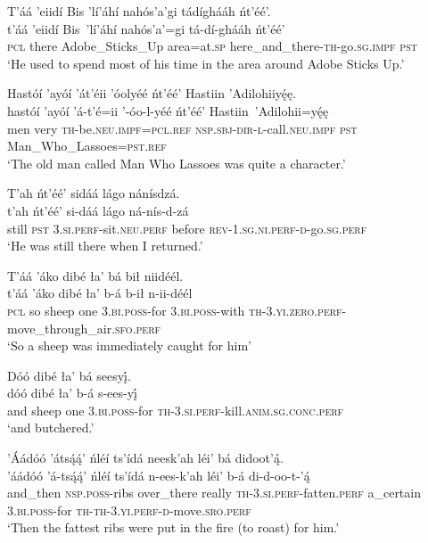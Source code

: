 \ea\label{ex:text2-3-2}
T’áá ’eiidí Bis ’lí’áhí nahós’a’gi tádíghááh ńt’éé’.\\
\gll t’áá	’eiidí	Bis~{’lí’áhí}	nahós’a’=gi	tá-dí-ghááh	ńt’éé’\\
     \textsc{pcl}	there	Adobe\_Sticks\_Up	area=at.\textsc{sp}	here\_and\_there-\textsc{th}-go.\textsc{sg}.\textsc{impf}	\textsc{pst}\\
\glt `He used to spend most of his time in the area around Adobe Sticks Up.'
\z

\ea\label{ex:text2-3-3}
Hastóí ’ayóí ’át’éii ’óolyéé ńt’éé’ Hastiin ’Adilohiiyę́ę.\\
\gll hastóí	’ayóí	’á-t’é=ii	’-óo-l-yéé	ńt’éé’	Hastiin~{’Adilohii=yę́ę}\\
     men	very	\textsc{th}-be.\textsc{neu}.\textsc{impf}=\textsc{pcl}.\textsc{ref}	\textsc{nsp}.\textsc{sbj}-\textsc{dir}-\textsc{l}-call.\textsc{neu}.\textsc{impf}	\textsc{pst}	Man\_Who\_Lassoes=\textsc{pst}.\textsc{ref}\\
\glt `The old man called Man Who Lassoes was quite a character.'
\z

\ea\label{ex:text2-4-1}
T’ah ńt’éé’ sidáá lágo nánísdzá.\\
\gll t’ah	ńt’éé’	si-dáá	lágo	ná-nís-d-zá\\
     still	\textsc{pst}	3.\textsc{si}.\textsc{perf}-sit.\textsc{neu}.\textsc{perf}	before	\textsc{rev}-1.\textsc{sg}.\textsc{ni}.\textsc{perf}-\textsc{d}-go.\textsc{sg}.\textsc{perf}\\
\glt `He was still there when I returned.'
\z

\ea\label{ex:text2-4-2}
T’áá ’áko dibé ła’ bá bił niidéél.\\
\gll t’áá	’áko	dibé	ła’	b-á	b-ił n-ii-déél\\
     \textsc{pcl}	so	sheep	one	3.\textsc{bi}.\textsc{poss}-for	3.\textsc{bi}.\textsc{poss}-with \textsc{th}-3.\textsc{yi}.\textsc{zero}.\textsc{perf}-move\_through\_air.\textsc{sfo}.\textsc{perf}\\
\glt `So a sheep was immediately caught for him'
\z

\ea\label{ex:text2-4-3}
Dóó dibé ła’ bá seesyį́.\\
\gll dóó	dibé	ła’	b-á	s-ees-yį́\\
     and	sheep	one	3.\textsc{bi}.\textsc{poss}-for	\textsc{th}-3.\textsc{si}.\textsc{perf}-kill.\textsc{anim}.\textsc{sg}.\textsc{conc}.\textsc{perf}\\
\glt `and butchered.'
\z

\newpage
\ea\label{ex:text2-4-4}
’Áádóó ’átsą́ą́’ ńléí ts’ídá neesk’ah léi’ bá didoot’ą́.\\
\gll ’áádóó	’á-tsą́ą́’	ńléí	ts’ídá	n-ees-k’ah	léi’	b-á	di-d-oo-t-’ą́\\
     and\_then	\textsc{nsp}.\textsc{poss}-ribs	over\_there	really	\textsc{th}-3.\textsc{si}.\textsc{perf}-fatten.\textsc{perf}	a\_certain	3.\textsc{bi}.\textsc{poss}-for	\textsc{th}-\textsc{th}-3.\textsc{yi}.\textsc{perf}-\textsc{d}-move.\textsc{sro}.\textsc{perf}\\
\glt `Then the fattest ribs were put in the fire (to roast) for him.'
\z

